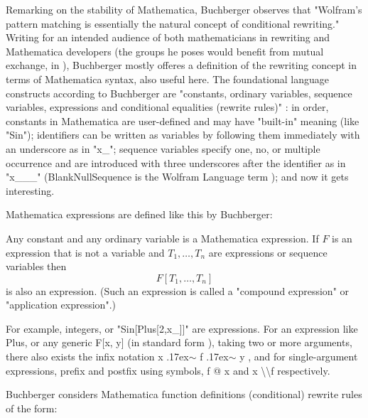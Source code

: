 Remarking on the stability of Mathematica, Buchberger observes that "Wolfram's pattern matching is essentially the natural concept of conditional rewriting." \cite[p. 2]{buchberger_mathematica_1996} Writing for an intended audience of both mathematicians in rewriting and Mathematica developers (the groups he poses would benefit from mutual exchange, in \cite{buchberger_mathematica_1996}), Buchberger mostly offeres a definition of the rewriting concept in terms of Mathematica syntax, also useful here. The foundational language constructs according to Buchberger are "constants, ordinary variables, sequence variables, expressions and conditional equalities (rewrite rules)" \cite[p. 3]{buchberger_mathematica_1996}: in order, constants in Mathematica are user-defined and may have "built-in" meaning (like "Sin"); identifiers can be written as variables by following them immediately with an underscore as in "x\_"; sequence variables specify one, no, or multiple occurrence and are introduced with three underscores after the identifier as in "x\_\_\_" (BlankNullSequence is the Wolfram Language term \cite{noauthor_blanknullsequencewolfram_nodate}); and now it gets interesting.

Mathematica expressions are defined like this by Buchberger:

\begin{displayquote}
Any constant and any ordinary variable is a Mathematica expression.
If \( F \) is an expression that is not a variable and \( T_1, \ldots, T_n \) are expressions or sequence variables then
\[
F[T_1, \ldots, T_n]
\]
is also an expression. (Such an expression is called a "compound expression" or "application expression".)
\cite[p. 4]{buchberger_mathematica_1996}
\end{displayquote}

For example, integers, or "Sin[Plus[2,x\_]]" are expressions. For an expression like Plus, or any generic F[x, y] (in standard form \cite{noauthor_expressionswolfram_nodate}), taking two or more arguments, there also exists the infix notation x {\raise.17ex\hbox{$\scriptstyle\sim$}} f {\raise.17ex\hbox{$\scriptstyle\sim$}} y \cite{noauthor_expressionswolfram_nodate}, and for single-argument expressions, prefix and postfix using symbols, f @ x and x \textbackslash \textbackslash  f \cite{noauthor_expressionswolfram_nodate} respectively. 

Buchberger considers Mathematica function definitions (conditional) rewrite rules \cite[p. 5]{buchberger_mathematica_1996} of the form:

